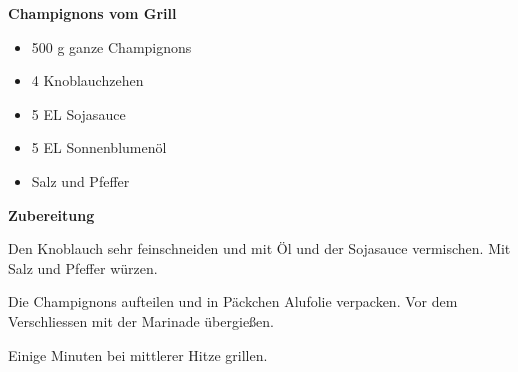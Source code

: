 

\parindent0pt	

\pagestyle{empty}


\textbf{{\LARGE Champignons vom Grill}}%

\hrulefill
\vspace*{\fill}
\begin{multicols}{2}	


\begin{itemize}
\item 500 g 	ganze Champignons
\item 4		Knoblauchzehen
\item 5 EL 	Sojasauce	
\item 5 EL	Sonnenblumenöl
\item Salz und Pfeffer
\end{itemize}
\end{multicols}
\vfill									%

\vspace{2cm}
%



\vfill
\newpage
\textbf{{\LARGE Zubereitung}}%

\hrulefill

\vspace*{\fill}
\begin{multicols}{2}

Den Knoblauch sehr feinschneiden und mit
Öl und der Sojasauce vermischen. Mit Salz und Pfeffer würzen.\newline

Die Champignons aufteilen und in Päckchen Alufolie verpacken.
Vor dem Verschliessen mit der Marinade übergießen.\newline

Einige Minuten bei mittlerer Hitze grillen.




\end{multicols}
\vfill
